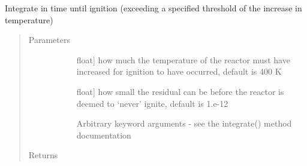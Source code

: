 \documentclass[letterpaper,10pt,english]{sphinxmanual}
\begin{document}
\begin{fulllineitems}
\begin{fulllineitems}
\end{fulllineitems}


\begin{fulllineitems}
\label{\detokenize{spitfire.chemistry.reactors:spitfire.chemistry.reactors.HomogeneousReactor.compute_ignition_delay_direct_griffon}}
Integrate in time until ignition (exceeding a specified threshold of the increase in temperature)
\begin{quote}\begin{description}
\item[{Parameters}] \leavevmode\begin{description}
\item[{}] \leavevmode{[}float{]}
how much the temperature of the reactor must have increased for ignition to have occurred, default is 400 K

\item[{}] \leavevmode{[}float{]}
how small the residual can be before the reactor is deemed to ‘never’ ignite, default is 1.e-12

\item[{}] \leavevmode
Arbitrary keyword arguments - see the integrate() method documentation

\end{description}

\item[{Returns}] \leavevmode\begin{description}
\item[{}] \leavevmode
\end{description}

\end{description}\end{quote}

\end{fulllineitems}



\end{fulllineitems}
\end{document}
